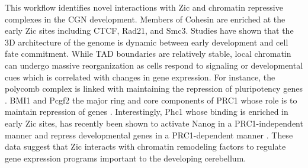 \documentclass[fleqn,10pt]{wlscirep}
\begin{document}


This workflow identifies novel interactions with Zic and chromatin repressive complexes in the CGN development. Members of Cohesin are enriched at the early Zic sites including CTCF, Rad21, and Smc3. Studies have shown that the 3D architecture of the genome is dynamic between early development and cell fate commitment. While TAD boundaries are relatively stable, local chromatin can undergo massive reorganization as cells respond to signaling or developmental cues which is correlated with changes in gene expression\cite{Zheng2019TheDifferentiation, Bonev2016OrganizationGenome}. For instance, the polycomb complex is linked with maintaining the repression of pluripotency genes \cite{Riising2014GeneWide}. BMI1 and Pcgf2 the major ring  and core components of PRC1 whose role is to maintain repression of genes \cite{Aranda2015RegulationProteins}. Interestingly, Phc1 whose binding is enriched in early Zic sites, has recently been shown to activate  Nanog in a PRC1-independent manner and repress developmental genes in a PRC1-dependent manner \cite{Chen2021Phc1Locus}. These data suggest that Zic interacts with chromatin remodeling factors to regulate gene expression programs important to the developing cerebellum. 
\end{document}
